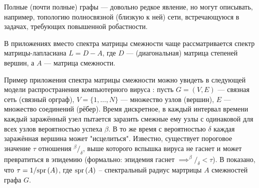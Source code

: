 Полные (почти полные) графы --- довольно редкое явление,
но могут описывать, например, топологию полносвязной (близкую к ней) сети,
встречающуюся в задачах, требующих повышенной робастности.

В приложениях вместо спектра матрицы смежности чаще рассматривается
спектр матрицы-лапласиана \( L = D - A \),
где \( D \) --- (диагональная) матрица степеней вершин,
а \( A \) --- матрица смежности.

Пример приложения спектра матрицы смежности можно увидеть
в следующей модели распространения компьютерного вируса \cite{epidemic-eigenvalues}:
пусть \( G = (V, E) \) --- связная сеть (связный орграф),
\( V = \{1, \ldots, N\} \) --- множество узлов (вершин),
\( E \) --- множество соединений (рёбер).
Время дискретное, в каждый интервал времени каждый заражённый узел
пытается заразить смежные ему узлы с одинаковой для всех узлов вероятностью успеха \( \beta \).
В то же время с вероятностью \( \delta \) каждая заражённая вершина может "исцелиться".
Известно, существует пороговое значение \( \tau \) отношения \( {^\beta}/_{\delta} \),
выше которого вспышка вируса не гаснет и может превратиться в эпидемию
(формально: эпидемия гаснет \( \implies ^{\beta}/_{\delta} < \tau \)).
В \cite{epidemic-eigenvalues} показано, что \( \tau = 1/\mathrm{spr}\left({A}\right) \),
где \( \mathrm{spr}\left({A}\right) \) -- спектральный радиус мартрицы \( A \) смежностей графа \( G \).
